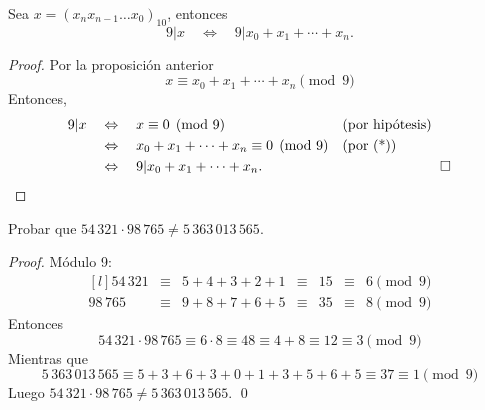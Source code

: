 \documentclass[handout]{beamer} %
\begin{document}
	
	\begin{frame}
		\begin{corolario} 	Sea $x = (x_nx_{n-1}\ldots x_0)_{10}$, entonces
			$$
			9|x\quad  \Leftrightarrow\quad 9|  x_0+x_1+\cdots+x_n.
			$$
		\end{corolario}
		\begin{proof}
			Por la proposición anterior 
			\begin{equation}
				x \equiv x_0+x_1+\cdots+x_n \pmod{9} \tag{*}
			\end{equation}
			Entonces,
			\begin{align*}
				9|x \quad& \Leftrightarrow \quad	x \equiv 0 \pmod{9}& &\text{(por hipótesis)} \\
				& \Leftrightarrow \quad	x_0+x_1+\cdots+x_n  \equiv 0 \pmod{9}& &\text{(por (*))} \\	
				& \Leftrightarrow  \quad 9 |	x_0+x_1+\cdots+x_n.  & &\quad\quad\quad\quad\quad\qed
			\end{align*}
		\end{proof}
	\end{frame}
	
	
	\begin{frame}
		
		\begin{ejemplo}Probar que \quad $54\,321 \cdot 98\,765\not= 5\,363\,013\,565$.
		\end{ejemplo}
		\begin{proof}
			Módulo 9:
			\begin{equation*}
				\begin{matrix*}[l]
					54\,321 & \equiv& 5 +4 +3+2+1 & \equiv& 15 & \equiv& 6 \pmod{9} \\
					98\,765 & \equiv& 9+8+ 7+6+5 & \equiv&  35  & \equiv& 8 \pmod{9} 
				\end{matrix*}
			\end{equation*}
			Entonces 
			\begin{equation*}
				54\,321 \cdot 98\,765 \equiv 6\cdot 8  \equiv 48  \equiv 4+8 \equiv 12 \equiv 3 \pmod{9} 
			\end{equation*}
			Mientras que 
			$$
			5\,363\,013\,565  \equiv 5+3+6+3+0+1+3+5+6+5  \equiv37   \equiv 1 \pmod{9} 
			$$
			Luego  $54\,321 \cdot 98\,765\not= 5\,363\,013\,565$. \qed
			
		\end{proof}
		
	\end{frame}
	
\end{document}
